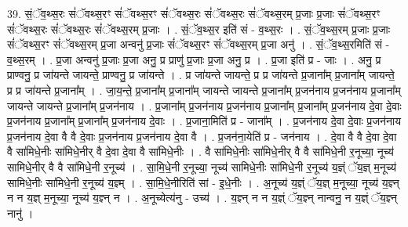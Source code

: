 \documentclass[17pt]{extarticle}
\begin{document}
39. सं॒ॅव॒थ्स॒रः सं॑ॅवथ्स॒रꣳ सं॑ॅवथ्स॒रꣳ सं॑ॅवथ्स॒रः सं॑ॅवथ्स॒रः सं॑ॅवथ्स॒रम् प्र॒जाः प्र॒जाः सं॑ॅवथ्स॒रꣳ सं॑ॅवथ्स॒रः सं॑ॅवथ्स॒रः सं॑ॅवथ्स॒रम् प्र॒जाः । . सं॒ॅव॒थ्स॒र इति॑ सं - व॒थ्स॒रः । . सं॒ॅव॒थ्स॒रम् प्र॒जाः प्र॒जाः सं॑ॅवथ्स॒रꣳ सं॑ॅवथ्स॒रम् प्र॒जा अन्वनु॑ प्र॒जाः सं॑ॅवथ्स॒रꣳ सं॑ॅवथ्स॒रम् प्र॒जा अनु॑ । . सं॒ॅव॒थ्स॒रमिति॑ सं - व॒थ्स॒रम् । . प्र॒जा अन्वनु॑ प्र॒जाः प्र॒जा अनु॒ प्र प्राणु॑ प्र॒जाः प्र॒जा अनु॒ प्र । . प्र॒जा इति॑ प्र - जाः । . अनु॒ प्र प्राण्वनु॒ प्र जा॑यन्ते जायन्ते॒ प्राण्वनु॒ प्र जा॑यन्ते । . प्र जा॑यन्ते जायन्ते॒ प्र प्र जा॑यन्ते प्र॒जाना᳚म् प्र॒जाना᳚म् जायन्ते॒ प्र प्र जा॑यन्ते प्र॒जाना᳚म् । . जा॒य॒न्ते॒ प्र॒जाना᳚म् प्र॒जाना᳚म् जायन्ते जायन्ते प्र॒जाना᳚म् प्र॒जन॑नाय प्र॒जन॑नाय प्र॒जाना᳚म् जायन्ते जायन्ते प्र॒जाना᳚म् प्र॒जन॑नाय । . प्र॒जाना᳚म् प्र॒जन॑नाय प्र॒जन॑नाय प्र॒जाना᳚म् प्र॒जाना᳚म् प्र॒जन॑नाय दे॒वा दे॒वाः प्र॒जन॑नाय प्र॒जाना᳚म् प्र॒जाना᳚म् प्र॒जन॑नाय दे॒वाः । . प्र॒जाना॒मिति॑ प्र - जाना᳚म् । . प्र॒जन॑नाय दे॒वा दे॒वाः प्र॒जन॑नाय प्र॒जन॑नाय दे॒वा वै वै दे॒वाः प्र॒जन॑नाय प्र॒जन॑नाय दे॒वा वै । . प्र॒जन॑ना॒येति॑ प्र - जन॑नाय । . दे॒वा वै वै दे॒वा दे॒वा वै सा॑मिधे॒नीः सा॑मिधे॒नीर् वै दे॒वा दे॒वा वै सा॑मिधे॒नीः । . वै सा॑मिधे॒नीः सा॑मिधे॒नीर् वै वै सा॑मिधे॒नी र॒नूच्या॒ नूच्य॑ सामिधे॒नीर् वै वै सा॑मिधे॒नी र॒नूच्य॑ । . सा॒मि॒धे॒नी र॒नूच्या॒ नूच्य॑ सामिधे॒नीः सा॑मिधे॒नी र॒नूच्य॑ य॒ज्ञ्ं ॅय॒ज्ञ् म॒नूच्य॑ सामिधे॒नीः सा॑मिधे॒नी र॒नूच्य॑ य॒ज्ञ्म् । . सा॒मि॒धे॒नीरिति॑ सां - इ॒धे॒नीः । . अ॒नूच्य॑ य॒ज्ञ्ं ॅय॒ज्ञ् म॒नूच्या॒ नूच्य॑ य॒ज्ञ्न् न न य॒ज्ञ् म॒नूच्या॒ नूच्य॑ य॒ज्ञ्न् न । . अ॒नूच्येत्य॑नु - उच्य॑ । . य॒ज्ञ्न् न न य॒ज्ञ्ं ॅय॒ज्ञ्न् नान्वनु॒ न य॒ज्ञ्ं ॅय॒ज्ञ्न् नानु॑ । \newline
\end{document}
